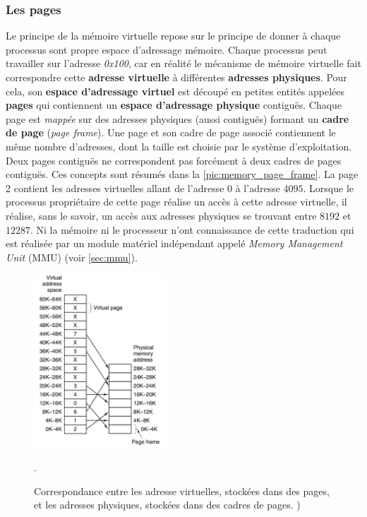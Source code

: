 \subsubsection{Les pages}
Le principe de la mémoire virtuelle repose sur le principe de donner à chaque processus sont propre espace d'adressage mémoire. Chaque processus peut travailler sur l'adresse \textit{0x100}, car en réalité le mécanisme de mémoire virtuelle fait correspondre cette \textbf{adresse virtuelle} à différentes \textbf{adresses physiques}. Pour cela, son \textbf{espace d'adressage virtuel} est découpé en petites entités appelées \textbf{pages} qui contiennent un \textbf{espace d'adressage physique} contiguës. Chaque page est \textit{mappée} sur des adresses physiques (aussi contiguës) formant un \textbf{cadre de page} (\textit{page frame}). Une page et son cadre de page associé contiennent le même nombre d'adresses, dont la taille est choisie par le système d'exploitation. Deux pages contiguës ne correspondent pas forcément à deux cadres de pages contiguës. Ces concepts sont résumés dans la \autoref{pic:memory_page_frame}. La page 2 contient les adresses virtuelles allant de l'adresse $0$ à l'adresse $4095$. Lorsque le processus propriétaire de cette page réalise un accès à cette adresse virtuelle, il réalise, sans le savoir, un accès aux adresses physiques se trouvant entre $8192$ et $12287$. Ni la mémoire ni le processeur n'ont connaissance de cette traduction qui est réalisée par un module matériel indépendant appelé \textit{Memory Management Unit} (MMU) (voir \autoref{sec:mmu}). 

\begin{figure}
    \center
    \includegraphics[width=5cm]{images/memory_page_frame.png}
    \caption{\label{pic:memory_page_frame} Correspondance entre les adresse virtuelles, stockées dans des pages, et les adresses physiques, stockées dans des cadres de pages.  \cite{tanenbaum2008systeme})}.
\end{figure}



